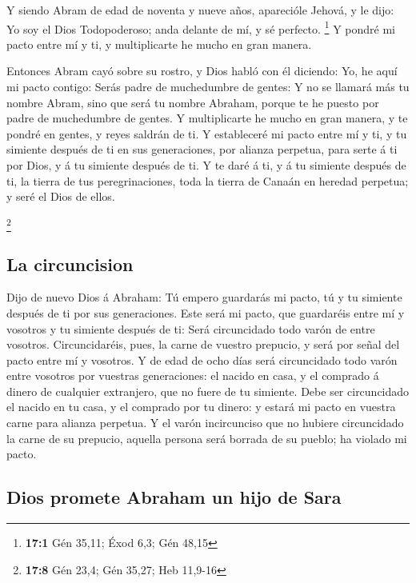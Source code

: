  Y siendo Abram de edad de noventa y nueve años,
aparecióle Jehová, y le dijo: Yo soy el Dios Todopoderoso; anda delante
de mí, y sé perfecto. \footnote{\textbf{17:1} Gén 35,11; Éxod 6,3; Gén
  48,15}  Y pondré mi pacto entre mí y ti, y multiplicarte
he mucho en gran manera.

 Entonces Abram cayó sobre su rostro, y Dios habló con él
diciendo:  Yo, he aquí mi pacto contigo: Serás padre de
muchedumbre de gentes:  Y no se llamará más tu nombre
Abram, sino que será tu nombre Abraham, porque te he puesto por padre de
muchedumbre de gentes.  Y multiplicarte he mucho en gran
manera, y te pondré en gentes, y reyes saldrán de ti.  Y
estableceré mi pacto entre mí y ti, y tu simiente después de ti en sus
generaciones, por alianza perpetua, para serte á ti por Dios, y á tu
simiente después de ti.  Y te daré á ti, y á tu simiente
después de ti, la tierra de tus peregrinaciones, toda la tierra de
Canaán en heredad perpetua; y seré el Dios de ellos.

\footnote{\textbf{17:8} Gén 23,4; Gén 35,27; Heb 11,9-16}

\hypertarget{la-circuncision}{%
\subsection{La circuncision}\label{la-circuncision}}

 Dijo de nuevo Dios á Abraham: Tú empero guardarás mi
pacto, tú y tu simiente después de ti por sus generaciones.
 Este será mi pacto, que guardaréis entre mí y vosotros y
tu simiente después de ti: Será circuncidado todo varón de entre
vosotros.  Circuncidaréis, pues, la carne de vuestro
prepucio, y será por señal del pacto entre mí y vosotros.
 Y de edad de ocho días será circuncidado todo varón
entre vosotros por vuestras generaciones: el nacido en casa, y el
comprado á dinero de cualquier extranjero, que no fuere de tu simiente.
 Debe ser circuncidado el nacido en tu casa, y el
comprado por tu dinero: y estará mi pacto en vuestra carne para alianza
perpetua.  Y el varón incircunciso que no hubiere
circuncidado la carne de su prepucio, aquella persona será borrada de su
pueblo; ha violado mi pacto.

\hypertarget{dios-promete-abraham-un-hijo-de-sara}{%
\subsection{Dios promete Abraham un hijo de
Sara}\label{dios-promete-abraham-un-hijo-de-sara}}

